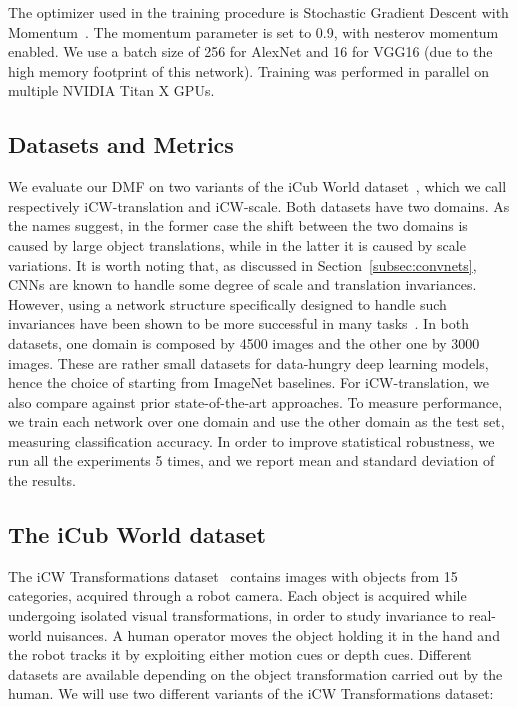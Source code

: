 \documentclass[../main.tex]{subfiles}
\begin{document}
    The optimizer used in the training procedure is Stochastic Gradient Descent with Momentum~\cite{momentum}. The momentum parameter
    is set to 0.9, with nesterov momentum~\cite{nesterov-momentum} enabled.
    We use a batch size of 256 for AlexNet and 16 for VGG16 (due to the high memory footprint of this network).
    Training was performed in parallel on multiple NVIDIA Titan X GPUs.

    \subsection{Datasets and Metrics}
    We evaluate our DMF on two variants of the iCub World dataset~\cite{icw}, which we call respectively iCW-translation and iCW-scale.
    Both datasets have two domains. As the names suggest, in the former case the shift between the two domains is caused by large
    object translations, while in the latter it is caused by scale variations. It is worth noting that, as discussed in Section~\ref{subsec:convnets},
    CNNs are known to handle some degree of scale and translation invariances. However, using a network structure specifically designed
    to handle such invariances have been shown to be more successful in many tasks~\cite{sppooling}. 
    In both datasets, one domain is composed by 4500 images and the other one by 3000 images. These are rather small
    datasets for data-hungry deep learning models, hence the choice of starting from ImageNet baselines.
    For iCW-translation, we also compare against prior state-of-the-art approaches.
    \newline\newline
    To measure performance, we train each network over one domain and use the other domain as the test set, measuring
    classification accuracy. In order to improve statistical robustness, we run all the
    experiments 5 times, and we report mean and standard deviation of the results.

    \subsection{The iCub World dataset}
    The iCW Transformations dataset~\cite{icw} contains images with objects from 15 categories, acquired through a robot camera.
    Each object is acquired while undergoing isolated visual transformations, in order to study invariance to real-world nuisances.
    A human operator moves the object holding it in the hand and the robot tracks it by exploiting either motion cues or depth cues.
    Different datasets are available depending on the object transformation carried out by the human.
    We will use two different variants of the iCW Transformations dataset:
\end{document}
